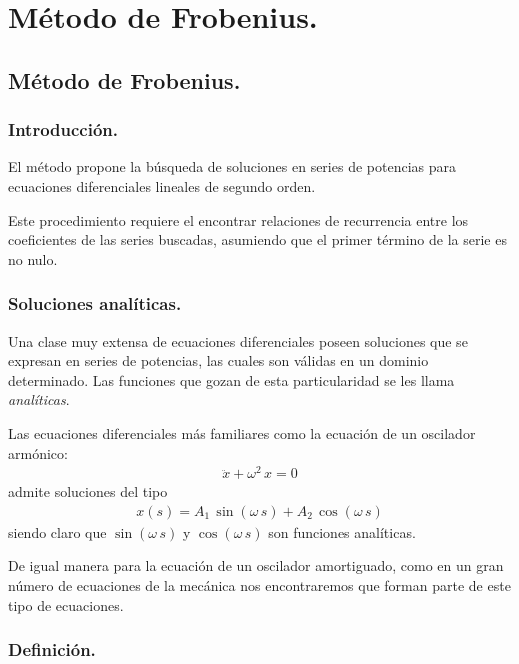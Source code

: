 \chapter{Método de Frobenius.}

\section{Método de Frobenius.}
\subsection{Introducción.}

El método propone la búsqueda de soluciones en series de potencias para ecuaciones diferenciales lineales de segundo orden.
\par
Este procedimiento requiere el encontrar relaciones de recurrencia entre los coeficientes de las series buscadas, asumiendo que el primer término de la serie es no nulo.

\subsection{Soluciones analíticas.}

Una clase muy extensa de ecuaciones diferenciales poseen soluciones que se expresan en series de potencias, las cuales son válidas en un dominio determinado. Las funciones que gozan de esta particularidad se les llama \emph{analíticas}.
\par
Las ecuaciones diferenciales más familiares como la ecuación de un oscilador armónico:
\begin{align*}
\ddot{x} + \omega^{2} \, x = 0
 \end{align*}
admite soluciones del tipo
\begin{align*}
x(s) = A_{1} \, \sin(\omega \, s) + A_{2} \, \cos (\omega \, s)
\end{align*}
siendo claro que $\sin(\omega \, s)$ y $\cos(\omega \, s)$ son funciones analíticas.
\par
De igual manera para la ecuación de un oscilador amortiguado, como en un gran número de ecuaciones de la mecánica nos encontraremos que forman parte de este tipo de ecuaciones.

\subsection{Definición.}

